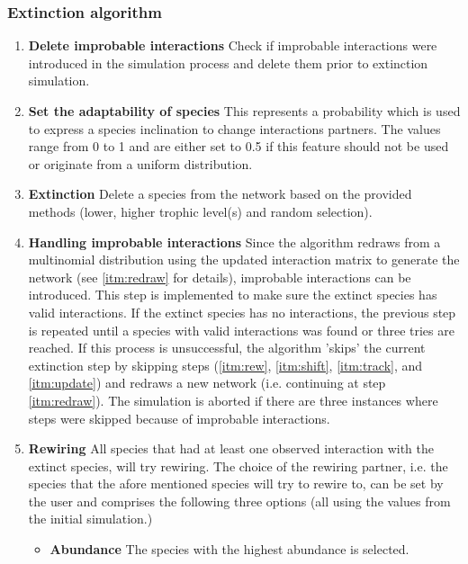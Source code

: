 \documentclass[12pt,a4paper]{article}
\begin{document}
\subsubsection{Extinction algorithm} \label{subsec:extc_alg}
\begin{enumerate} 
	\item \textbf{Delete improbable interactions} {\small Check if improbable interactions were introduced in the simulation process and delete them prior to extinction simulation.}
	\item \textbf{Set the adaptability of species} {\small This represents a probability which is used to express a species inclination to change interactions partners. The values range from 0 to 1 and are either set to 0.5 if this feature should not be used or originate from a uniform distribution.}
	\item \label{itm:etxc} \textbf{Extinction} {\small Delete a species from the network based on the provided methods (lower, higher trophic level(s) and random selection).}
	\item \label{itm:failsafe} \textbf{Handling improbable interactions} {\small Since the algorithm redraws from a multinomial distribution using the updated interaction matrix to generate the network (see \ref{itm:redraw} for details), improbable interactions can be introduced. This step is implemented to make sure the extinct species has valid interactions. If the extinct species has no interactions, the previous step is repeated until a species with valid interactions was found or three tries are reached. If this process is unsuccessful, the algorithm 'skips' the current extinction step by skipping steps (\ref{itm:rew}, \ref{itm:shift}, \ref{itm:track}, and \ref{itm:update}) and redraws a new network (i.e. continuing at step \ref{itm:redraw}). The simulation is aborted if there are three instances where steps were skipped because of improbable interactions.}
	\item \label{itm:rew} \textbf{Rewiring} {\small All species that had at least one observed interaction with the extinct species, will try rewiring. The choice of the rewiring partner, i.e. the species that the afore mentioned species will try to rewire to, can be set by the user and comprises the following three options (all using the values from the initial simulation.)}
		\begin{itemize}
		\item \label{itm:abund_rew} \textbf{Abundance} {\small The species with the highest abundance is selected.}

\end{itemize}
\end{enumerate}
\end{document}
